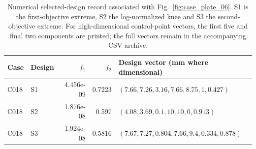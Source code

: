 \begin{table}[p]
\centering\scriptsize
\caption{Numerical selected-design record associated with Fig.~\ref{fig:case_plate_06}. S1 is the first-objective extreme, S2 the log-normalized knee and S3 the second-objective extreme. For high-dimensional control-point vectors, the first five and final two components are printed; the full vectors remain in the accompanying CSV archive.}
\label{tab:case_plate_06}
\setlength{\tabcolsep}{3.2pt}
\begin{tabularx}{\textwidth}{llrr>{\raggedright\arraybackslash}X}
\toprule Case & Design & $f_1$ & $f_2$ & Design vector (mm where dimensional) \\
\midrule
C018 & S1 & 4.456e-09 & 0.7223 & $(7.66, 7.26, 3.16, 7.66, 8.75, 1, 0.427)$ \\
C018 & S2 & 1.876e-08 & 0.597 & $(4.08, 3.69, 0.1, 10, 10, 0, 0.913)$ \\
C018 & S3 & 1.924e-08 & 0.5816 & $(7.67, 7.27, 0.804, 7.66, 9.4, 0.334, 0.878)$ \\
\bottomrule
\end{tabularx}
\end{table}

